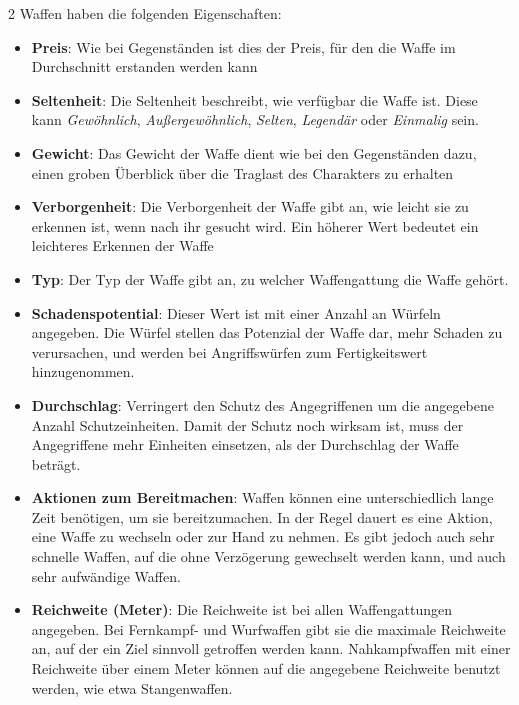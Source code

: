 \begin{multicols}{2}
Waffen haben die folgenden Eigenschaften:
\begin{itemize}
    \item \textbf{Preis}: Wie bei Gegenständen ist dies der Preis, für den die Waffe im Durchschnitt erstanden werden kann
    \item \textbf{Seltenheit}: Die Seltenheit beschreibt, wie verfügbar die Waffe ist. Diese kann \textit{Gewöhnlich}, \textit{Außergewöhnlich}, \textit{Selten}, \textit{Legendär} oder \textit{Einmalig} sein.
    \item \textbf{Gewicht}: Das Gewicht der Waffe dient wie bei den Gegenständen dazu, einen groben Überblick über die Traglast des Charakters zu erhalten
    \item \textbf{Verborgenheit}: Die Verborgenheit der Waffe gibt an, wie leicht sie zu erkennen ist, wenn nach ihr gesucht wird. Ein höherer Wert bedeutet ein leichteres Erkennen der Waffe
    \item \textbf{Typ}: Der Typ der Waffe gibt an, zu welcher Waffengattung die Waffe gehört.
    \item \textbf{Schadenspotential}: Dieser Wert ist mit einer Anzahl an Würfeln angegeben. Die Würfel stellen das Potenzial der Waffe dar, mehr Schaden zu verursachen, und werden bei Angriffswürfen zum Fertigkeitswert hinzugenommen.
    \item \textbf{Durchschlag}: Verringert den Schutz des Angegriffenen um die angegebene Anzahl Schutzeinheiten. Damit der Schutz noch wirksam ist, muss der Angegriffene mehr Einheiten einsetzen, als der Durchschlag der Waffe beträgt.
    \item \textbf{Aktionen zum Bereitmachen}: Waffen können eine unterschiedlich lange Zeit benötigen, um sie bereitzumachen. In der Regel dauert es eine Aktion, eine Waffe zu wechseln oder zur Hand zu nehmen. Es gibt jedoch auch sehr schnelle Waffen, auf die ohne Verzögerung gewechselt werden kann, und auch sehr aufwändige Waffen.
    \item \textbf{Reichweite (Meter)}: Die Reichweite ist bei allen Waffengattungen angegeben. Bei Fernkampf- und Wurfwaffen gibt sie die maximale Reichweite an, auf der ein Ziel sinnvoll getroffen werden kann. Nahkampfwaffen mit einer Reichweite über einem Meter können auf die angegebene Reichweite benutzt werden, wie etwa Stangenwaffen.
\end{itemize}


\end{multicols}
